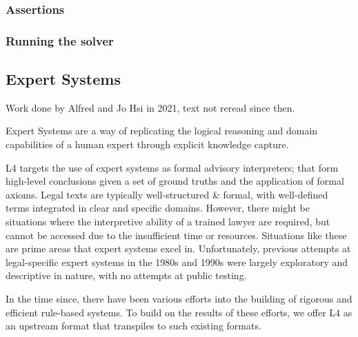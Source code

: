 \subsubsection{Assertions}\label{sec:assertions}


\subsubsection{Running the solver}\label{sec:running_solver}



\subsection{Expert Systems}\label{sec:epert_systems}

\begin{tcolorbox}[breakable,colback=red!5!white,colframe=red!75!black,
  title=Comments on status]
Work done by Alfred and Jo Hsi in 2021, text not reread since then.
\end{tcolorbox}



Expert Systems are a way of replicating the logical reasoning and domain 
capabilities of a human expert through explicit knowledge capture.

L4 targets the use of expert systems as formal advisory interpreters; that form 
high-level conclusions given a set of ground truths and the application of formal 
axioms. 
Legal texts are typically well-structured \& formal, with well-defined 
terms integrated in clear and specific domains. However, there might be 
situations where the interpretive ability of a trained lawyer are required, 
but cannot be accessed due to the insufficient time or resources. Situations like
these are prime areas that expert systems excel in. Unfortunately,  
previous attempts at legal-specific expert systems in the 1980s and 1990s were 
largely exploratory and descriptive in nature, with no attempts at public testing. \cite{leith2016riseandfall}

In the time since, there have been various efforts into the building of rigorous 
and efficient rule-based systems.
To build on the results of these efforts, we offer L4 as an upstream format that 
transpiles to such existing formats. 

